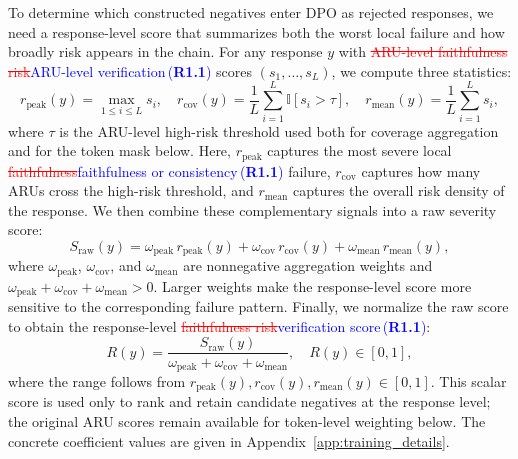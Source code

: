 \documentclass[a4paper,fleqn,doubleblind]{cas-sc}
\DeclareRobustCommand{\deleted}[1]{\textcolor{red}{\sout{#1}}}
\DeclareRobustCommand{\added}[1]{\textcolor{blue}{#1}}
\DeclareRobustCommand{\revtag}[1]{\textcolor{blue}{\scriptsize\,(\textbf{#1})}}
\begin{document}
To determine which constructed negatives enter DPO as rejected responses, we need a response-level score that summarizes both the worst local failure and how broadly risk appears in the chain. For any response $y$ with \deleted{ARU-level faithfulness risk}\added{ARU-level verification}\revtag{R1.1} scores $(s_1,\dots,s_L)$, we compute three statistics:
\begin{equation}
\label{eq:severity_components}
r_{\text{peak}}(y)=\max_{1 \le i \le L} s_i, \quad
r_{\text{cov}}(y)=\frac{1}{L}\sum_{i=1}^{L}\mathbb{I}[s_i>\tau], \quad
r_{\text{mean}}(y)=\frac{1}{L}\sum_{i=1}^{L} s_i,
\end{equation}
where $\tau$ is the ARU-level high-risk threshold used both for coverage aggregation and for the token mask below. Here, $r_{\text{peak}}$ captures the most severe local \deleted{faithfulness}\added{faithfulness or consistency}\revtag{R1.1} failure, $r_{\text{cov}}$ captures how many ARUs cross the high-risk threshold, and $r_{\text{mean}}$ captures the overall risk density of the response. We then combine these complementary signals into a raw severity score:
\begin{equation}
\label{eq:severity_raw}
S_{\text{raw}}(y)=\omega_{\text{peak}} \, r_{\text{peak}}(y)+\omega_{\text{cov}} \, r_{\text{cov}}(y)+\omega_{\text{mean}} \, r_{\text{mean}}(y),
\end{equation}
where $\omega_{\text{peak}}$, $\omega_{\text{cov}}$, and $\omega_{\text{mean}}$ are nonnegative aggregation weights and $\omega_{\text{peak}}+\omega_{\text{cov}}+\omega_{\text{mean}}>0$. Larger weights make the response-level score more sensitive to the corresponding failure pattern. Finally, we normalize the raw score to obtain the response-level \deleted{faithfulness risk}\added{verification score}\revtag{R1.1}:
\begin{equation}
\label{eq:faithfulness_risk_score}
R(y)=\frac{S_{\text{raw}}(y)}{\omega_{\text{peak}}+\omega_{\text{cov}}+\omega_{\text{mean}}}, \quad R(y)\in [0,1],
\end{equation}
where the range follows from $r_{\text{peak}}(y),r_{\text{cov}}(y),r_{\text{mean}}(y)\in[0,1]$. This scalar score is used only to rank and retain candidate negatives at the response level; the original ARU scores remain available for token-level weighting below. The concrete coefficient values are given in Appendix~\ref{app:training_details}.
\end{document}
